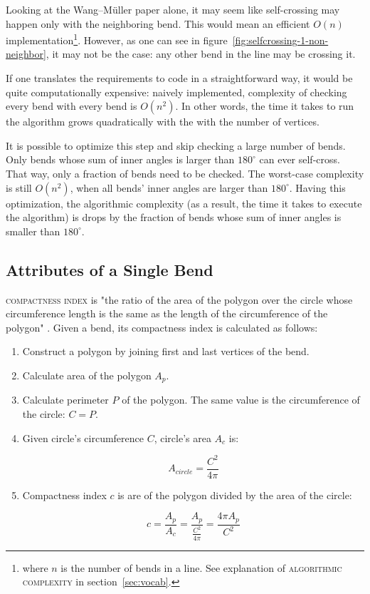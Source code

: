 \documentclass[a4paper]{article}
\newcommand{\WM}{Wang--M{\"u}ller}
\begin{document}
Looking at the {\WM} paper alone, it may seem like self-crossing may happen
only with the neighboring bend. This would mean an efficient $O(n)$
implementation\footnote{where $n$ is the number of bends in a line. See
explanation of \textsc{algorithmic complexity} in section~\ref{sec:vocab}.}.
However, as one can see in figure~\ref{fig:selfcrossing-1-non-neighbor}, it may
not be the case: any other bend in the line may be crossing it.

If one translates the requirements to code in a straightforward way, it would
be quite computationally expensive: naively implemented, complexity of checking
every bend with every bend is $O(n^2)$. In other words, the time it takes to
run the algorithm grows quadratically with the with the number of vertices.

It is possible to optimize this step and skip checking a large number of bends.
Only bends whose sum of inner angles is larger than $180^\circ$ can ever
self-cross. That way, only a fraction of bends need to be checked. The
worst-case complexity is still $O(n^2)$, when all bends' inner angles are
larger than $180^\circ$. Having this optimization, the algorithmic complexity
(as a result, the time it takes to execute the algorithm) is drops by the
fraction of bends whose sum of inner angles is smaller than $180^\circ$.

\subsection{Attributes of a Single Bend}

\textsc{compactness index} is "the ratio of the area of the polygon over the
circle whose circumference length is the same as the length of the
circumference of the polygon" \cite{wang1998line}. Given a bend, its
compactness index is calculated as follows:

\begin{enumerate}

  \item Construct a polygon by joining first and last vertices of the bend.

  \item Calculate area of the polygon $A_{p}$.

  \item Calculate perimeter $P$ of the polygon. The same value is the
      circumference of the circle: $C = P$.

    \item Given circle's circumference $C$, circle's area $A_{c}$ is:

    \[
      A_{circle} = \frac{C^2}{4\pi}
    \]

  \item Compactness index $c$ is are of the polygon divided by the area of the
    circle:

    \[
      c = \frac{A_{p}}{A_{c}} =
        \frac{A_{p}}{ \frac{C^2}{4\pi} } =
        \frac{4\pi A_{p}}{C^2}
    \]

\end{enumerate}
\end{document}
